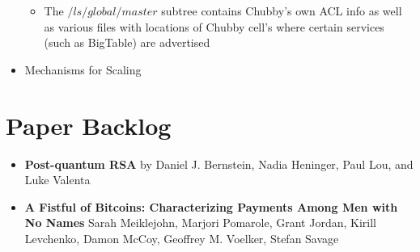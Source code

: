 \documentclass[a4paper]{article}
\begin{document}
\begin{itemize}
\begin{itemize}
\item The $/ls/global/master$ subtree contains Chubby's own ACL info as well as various files with locations of Chubby cell's where certain services (such as BigTable) are advertised  
\end{itemize}

\item Mechanisms for Scaling
\begin{itemize}

\end{itemize}

\end{itemize}


\section {Paper Backlog}

\begin{itemize}
\item \textbf{Post-quantum RSA} by Daniel J. Bernstein, Nadia Heninger, Paul Lou, and Luke Valenta

\item \textbf{A Fistful of Bitcoins: Characterizing Payments Among Men with No Names} Sarah Meiklejohn, Marjori Pomarole, Grant Jordan, Kirill Levchenko, Damon McCoy, Geoffrey M. Voelker, Stefan Savage
\end{itemize}






\end{document}
